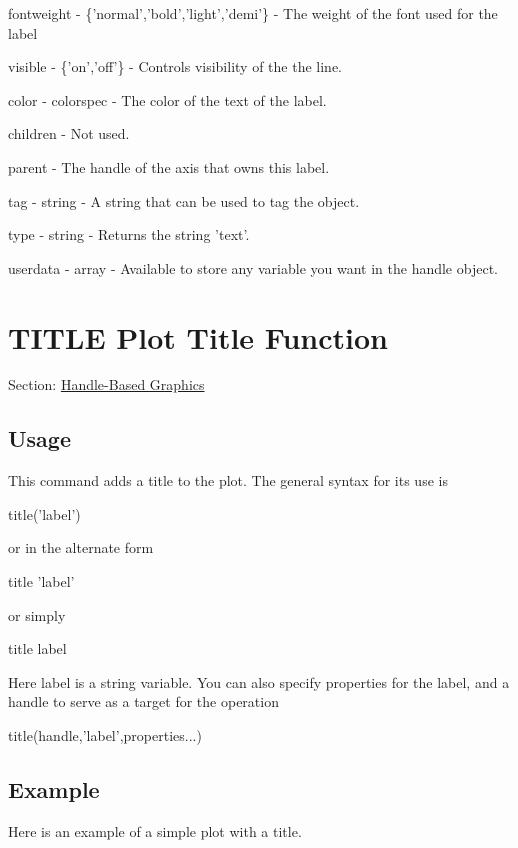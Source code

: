 \begin{DoxyItemize}
\item {\ttfamily fontweight} -\/ {\ttfamily \{'normal','bold','light','demi'\}} -\/ The weight of the font used for the label  
\item {\ttfamily visible} -\/ {\ttfamily \{'on','off'\}} -\/ Controls visibility of the the line.  
\item {\ttfamily color} -\/ {\ttfamily colorspec} -\/ The color of the text of the label.  
\item {\ttfamily children} -\/ Not used.  
\item {\ttfamily parent} -\/ The handle of the axis that owns this label.  
\item {\ttfamily tag} -\/ {\ttfamily string} -\/ A string that can be used to tag the object.  
\item {\ttfamily type} -\/ {\ttfamily string} -\/ Returns the string {\ttfamily 'text'}.  
\item {\ttfamily userdata} -\/ {\ttfamily array} -\/ Available to store any variable you want in the handle object.  
\end{DoxyItemize}\hypertarget{handle_title}{}\section{T\-I\-T\-L\-E Plot Title Function}\label{handle_title}
Section\-: \hyperlink{sec_handle}{Handle-\/\-Based Graphics} \hypertarget{vtkwidgets_vtkxyplotwidget_Usage}{}\subsection{Usage}\label{vtkwidgets_vtkxyplotwidget_Usage}
This command adds a title to the plot. The general syntax for its use is \begin{DoxyVerb}  title('label')
\end{DoxyVerb}
 or in the alternate form \begin{DoxyVerb}  title 'label'
\end{DoxyVerb}
 or simply \begin{DoxyVerb}  title label
\end{DoxyVerb}
 Here {\ttfamily label} is a string variable. You can also specify properties for the label, and a handle to serve as a target for the operation \begin{DoxyVerb}  title(handle,'label',properties...)
\end{DoxyVerb}
 \hypertarget{variables_struct_Example}{}\subsection{Example}\label{variables_struct_Example}
Here is an example of a simple plot with a title.


